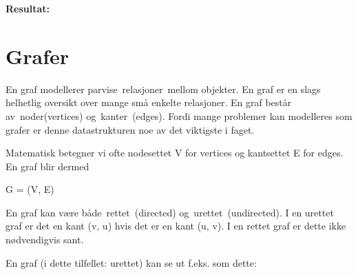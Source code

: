\documentclass[12pt]{report}
\begin{document}
\begin{multicols}{2}

\par

{\fontsize{13pt}{15.6pt}\selectfont \textbf{\textcolor[HTML]{353535}{Resultat:}}\par}\par


\vspace{\baselineskip}

\end{multicols}



\newpage

\vspace{\baselineskip}\section*{Grafer}
\setlength{\parskip}{0.0pt}
En graf modellerer parvise relasjoner mellom objekter. En graf er en slags helhetlig oversikt over mange små enkelte relasjoner. En graf består av noder(vertices) og kanter (edges). Fordi mange problemer kan modelleres som grafer er denne datastrukturen noe av det viktigste i faget.\par

\setlength{\parskip}{10.56pt}
Matematisk betegner vi ofte nodesettet V for vertices og kantsettet E for edges. En graf blir dermed\par

G = (V, E)\par

\setlength{\parskip}{0.0pt}
En graf kan være både rettet (directed) og urettet (undirected). I en urettet graf er det en kant (v, u) hvis det er en kant (u, v). I en rettet graf er dette ikke nødvendigvis sant.\par


\vspace{\baselineskip}
\setlength{\parskip}{10.56pt}
En graf (i dette tilfellet: urettet) kan se ut f.eks. som dette:\par


\vspace{\baselineskip}


\end{document}
